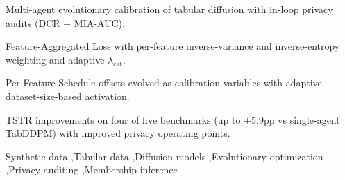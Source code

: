 \documentclass[preprint,12pt]{elsarticle}
\begin{document}
\begin{frontmatter}
\begin{abstract}
Across five real-world tabular benchmarks, MADiff-T improves TSTR utility over the original single-agent baseline on four of five datasets while shifting the utility--privacy operating point through privacy-in-the-loop selection. We further introduce two training enhancements: (i) a \textbf{Feature-Aggregated (FA) Loss} that re-weights continuous and categorical loss terms by per-feature inverse variance and inverse entropy, preventing high-variance features from monopolizing gradient signal, and (ii) \textbf{Per-Feature Schedule (PFS) offsets} that extend the evolutionary search to per-feature noise schedule perturbations, with adaptive activation based on dataset size and feature-type composition. Together these enhancements improve TSTR by up to $+$5.9 percentage 
points over the single-agent TabDDPM baseline. Importantly, MADiff-T uses multi-agent refinement only during training; deployment uses a single selected model. All privacy results are \emph{audit-based} under stated protocols and do not constitute a formal differential privacy guarantee.
\end{abstract}

\begin{highlights}
\item Multi-agent evolutionary calibration of tabular diffusion with in-loop privacy audits (DCR + MIA-AUC).
\item Feature-Aggregated Loss with per-feature inverse-variance and inverse-entropy weighting and adaptive $\lambda_{\text{cat}}$.
\item Per-Feature Schedule offsets evolved as calibration variables with adaptive dataset-size-based activation.
\item TSTR improvements on four of five benchmarks (up to $+$5.9pp 
vs single-agent TabDDPM) with improved privacy operating points.
\end{highlights}

\begin{keyword}
Synthetic data \sep Tabular data \sep Diffusion models \sep Evolutionary optimization \sep Privacy auditing \sep Membership inference
\end{keyword}

\end{frontmatter}

\end{document}

